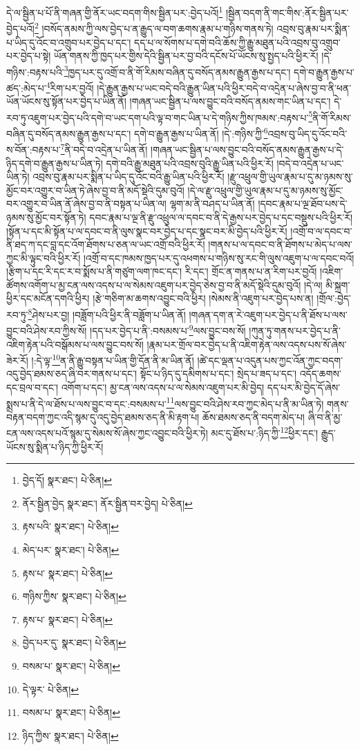 དེ་ལ་སྦྱིན་པ་པོ་ནི་གཞན་གྱི་ནོར་ཡང་བདག་གིས་སྦྱིན་པར་:བྱེད་པའོ།\footnote{བྱེད་དོ།  སྣར་ཐང་།  པེ་ཅིན། } །སྦྱིན་བདག་ནི་གང་གིས་:ནོར་སྦྱིན་པར་བྱེད་པའོ།\footnote{ནོར་སྦྱིན་བྱེད  སྣར་ཐང་། ནོར་སྦྱིན་བར་བྱེད།  པེ་ཅིན། } །བསོད་ནམས་ཀྱི་ལས་བྱེད་པ་ན་རྒྱུད་ལ་བག་ཆགས་རྣམ་པ་གཉིས་གནས་ཏེ། འབྲས་བུ་རྣམ་པར་སྨིན་པ་ཡིད་དུ་འོང་བ་འགྲུབ་པར་བྱེད་པ་དང་། དད་པ་ལ་སོགས་པ་དགེ་བའི་ཆོས་ཀྱི་རྒྱུ་མཐུན་པའི་འབྲས་བུ་འགྲུབ་པར་བྱེད་པ་སྟེ། ཡོན་གནས་ཀྱི་ཁྱད་པར་གྱིས་དེའི་སྦྱིན་པར་བྱ་བའི་དངོས་པོ་ཡོངས་སུ་སྤྱད་པའི་ཕྱིར་རོ། །དེ་གཉིས་:བརྟས་པའི་\footnote{རྟས་པའི་  སྣར་ཐང་།  པེ་ཅིན། }ཁྱད་པར་དུ་འགྲོ་བ་ནི་གོ་རིམས་བཞིན་དུ་བསོད་ནམས་རྒྱུན་རྒྱས་པ་དང་། དགེ་བ་རྒྱུན་རྒྱས་པ་ཚད་:མེད་པ་\footnote{མེད་པར་  སྣར་ཐང་།  པེ་ཅིན། }རིག་པར་བྱའོ། །དེ་རྒྱུན་རྒྱས་པ་ཡང་བདེ་བའི་རྒྱུན་ཡིན་པའི་ཕྱིར་བདེ་བ་འདྲེན་པ་ཞེས་བྱ་བ་ནི་ཕན་ཡོན་ཡོངས་སུ་སྟོན་པར་བྱེད་པ་ཡིན་ནོ། །གཞན་ཡང་སྦྱིན་པ་ལས་བྱུང་བའི་བསོད་ནམས་གང་ཡིན་པ་དང་། དེ་རབ་ཏུ་འཇུག་པར་བྱེད་པའི་དགེ་བ་ཡང་དག་པའི་ལྟ་བ་གང་ཡིན་པ་དེ་གཉིས་ཀྱིས་ཁམས་:བརྟས་པ་\footnote{རྟས་པ་  སྣར་ཐང་།  པེ་ཅིན། }ནི་གོ་རིམས་བཞིན་དུ་བསོད་ནམས་རྒྱུན་རྒྱས་པ་དང་། དགེ་བ་རྒྱུན་རྒྱས་པ་ཡིན་ནོ། །དེ་:གཉིས་ཀྱི་\footnote{གཉིས་ཀྱིས་  སྣར་ཐང་།  པེ་ཅིན། }འབྲས་བུ་ཡིད་དུ་འོང་བའི་ས་བོན་:བརྟས་པ་\footnote{རྟས་པ་  སྣར་ཐང་།  པེ་ཅིན། }ནི་བདེ་བ་འདྲེན་པ་ཡིན་ནོ། །གཞན་ཡང་སྦྱིན་པ་ལས་བྱུང་བའི་བསོད་ནམས་རྒྱུན་རྒྱས་པ་དེ་ཉིད་དགེ་བ་རྒྱུན་རྒྱས་པ་ཡིན་ཏེ། དགེ་བའི་རྒྱུ་མཐུན་པའི་འབྲས་བུའི་རྒྱུ་ཡིན་པའི་ཕྱིར་རོ། །བདེ་བ་འདྲེན་པ་ཡང་ཡིན་ཏེ། འབྲས་བུ་རྣམ་པར་སྨིན་པ་ཡིད་དུ་འོང་བའི་རྒྱུ་ཡིན་པའི་ཕྱིར་རོ། །རྫུ་འཕྲུལ་གྱི་ཡུལ་རྣམ་པ་དུ་མ་ཉམས་སུ་མྱོང་བར་འགྱུར་བ་ཡིན་ཏེ་ཞེས་བྱ་བ་ནི་མདོ་སྡེའི་དུམ་བུའོ། །དེ་ལ་རྫུ་འཕྲུལ་གྱི་ཡུལ་རྣམ་པ་དུ་མ་ཉམས་སུ་མྱོང་བར་འགྱུར་བ་ཡིན་ནོ་ཞེས་བྱ་བ་ནི་བསྟན་པ་ཡིན་ལ། ལྷག་མ་ནི་བཤད་པ་ཡིན་ནོ། །དབང་རྣམ་པ་ལྔ་ཐོབ་པས་དེ་ཉམས་སུ་མྱོང་བར་སྟོན་ཏེ། དབང་རྣམ་པ་ལྔ་ནི་རྫུ་འཕྲུལ་ལ་དབང་བ་ནི་དེ་རྒྱས་པར་བྱེད་པ་དང་བསྡུས་པའི་ཕྱིར་རོ། །སྟོན་པ་དང་མི་སྟོན་པ་ལ་དབང་བ་ནི་ལུས་སྣང་བར་བྱེད་པ་དང་སྣང་བར་མི་བྱེད་པའི་ཕྱིར་རོ། །འགྲོ་བ་ལ་དབང་བ་ནི་ཐད་ཀ་དང་བླ་དང་འོག་ཐོགས་པ་ཅན་ལ་ཡང་འགྲོ་བའི་ཕྱིར་རོ། །གནས་པ་ལ་དབང་བ་ནི་ཐོགས་པ་མེད་པ་ལས་ཀྱང་མི་ལྟུང་བའི་ཕྱིར་རོ། །འགྲོ་བ་དང་ཁམས་ཁྱད་པར་དུ་འཕགས་པ་གཉིས་སུ་རང་གི་ལུས་འཇུག་པ་ལ་དབང་བའོ། །རྩིག་པ་དང་རི་དང་ར་བ་སྨོས་པ་ནི་གཙུག་ལག་ཁང་དང་། རི་དང་། གྲོང་ན་གནས་པ་ན་རིག་པར་བྱའོ། །འཇིག་ཚོགས་འགོག་པ་མྱ་ངན་ལས་འདས་པ་ལ་སེམས་འཇུག་པར་བྱེད་ཅེས་བྱ་བ་ནི་མདོ་སྡེའི་དུམ་བུའོ། །དེ་ལ། མི་སྐྲག་ཕྱིར་དང་མངོན་དགའི་ཕྱིར། །རྩེ་གཅིག་མ་ཆགས་འབྱུང་བའི་ཕྱིར། །སེམས་ནི་འཇུག་པར་བྱེད་པས་ན། །གྲོལ་:བྱེད་རབ་ཏུ་\footnote{བྱེད་པར་དུ་  སྣར་ཐང་།  པེ་ཅིན། }ཤེས་པར་བྱ། །བཟློག་པའི་ཕྱིར་ནི་བཟློག་པ་ཡིན་ནོ། །གཞན་དག་ན་རེ་འཇུག་པར་བྱེད་པ་ནི་ཐོས་པ་ལས་བྱུང་བའི་ཤེས་རབ་ཀྱིས་སོ། །དད་པར་བྱེད་པ་ནི་:བསམས་པ་\footnote{བསམ་པ་  སྣར་ཐང་།  པེ་ཅིན། }ལས་བྱུང་བས་སོ། །ཀུན་ཏུ་གནས་པར་བྱེད་པ་ནི་འཇིག་རྟེན་པའི་བསྒོམས་པ་ལས་བྱུང་བས་སོ། །རྣམ་པར་གྲོལ་བར་བྱེད་པ་ནི་འཇིག་རྟེན་ལས་འདས་པས་སོ་ཞེས་ཟེར་རོ། །:དེ་ལྟ་\footnote{དེ་ལྟར་  པེ་ཅིན། }ན་ནི་རྒྱུ་བསྟན་པ་ཡིན་གྱི་དོན་ནི་མ་ཡིན་ནོ། །ཚེ་དང་ལྡན་པ་འདུན་པས་ཀྱང་འོན་ཀྱང་བདག་འདུ་བྱེད་ཐམས་ཅད་ཞི་བར་གནས་པ་དང་། སྟོང་པ་ཉིད་དུ་དམིགས་པ་དང་། སྲེད་པ་ཟད་པ་དང་། འདོད་ཆགས་དང་བྲལ་བ་དང་། འགོག་པ་དང་། མྱ་ངན་ལས་འདས་པ་ལ་སེམས་འཇུག་པར་མི་བྱེད། དད་པར་མི་བྱེད་དོ་ཞེས་སྨྲས་པ་ནི་དེ་ལ་ཐོས་པ་ལས་བྱུང་བ་དང་:བསམས་པ་\footnote{བསམ་པ་  སྣར་ཐང་།  པེ་ཅིན། }ལས་བྱུང་བའི་ཤེས་རབ་ཀྱང་མེད་པ་ནི་མ་ཡིན་ཏེ། གནས་བརྟན་བདག་ཀྱང་འདི་སྙམ་དུ་འདུ་བྱེད་ཐམས་ཅད་ནི་མི་རྟག་པ། ཆོས་ཐམས་ཅད་ནི་བདག་མེད་པ། ཞི་བ་ནི་མྱ་ངན་ལས་འདས་པའོ་སྙམ་དུ་སེམས་སོ་ཞེས་ཀྱང་འབྱུང་བའི་ཕྱིར་ཏེ། མང་དུ་ཐོས་པ་:ཉིད་ཀྱི་\footnote{ཉིད་ཀྱིས་  སྣར་ཐང་།  པེ་ཅིན། }ཕྱིར་དང་། རྒྱུད་ཡོངས་སུ་སྨིན་པ་ཉིད་ཀྱི་ཕྱིར་རོ། 